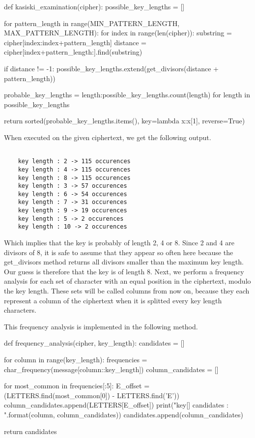 \documentclass{article}
\begin{document}
\begin{python}
def kasiski_examination(cipher):
    possible_key_lengths = []

    for pattern_length in range(MIN_PATTERN_LENGTH, MAX_PATTERN_LENGTH):
        for index in range(len(cipher)):
            substring = cipher[index:index+pattern_length]
            distance = cipher[index+pattern_length:].find(substring)

            if distance != -1:
                possible_key_lengths.extend(get_divisors(distance + pattern_length))

    probable_key_lengths = {length:possible_key_lengths.count(length) for length in possible_key_lengths}

    return sorted(probable_key_lengths.items(), key=lambda x:x[1], reverse=True)
\end{python}

\bigskip
When executed on the given ciphertext, we get the following output.

\begin{verbatim}

    key length : 2 -> 115 occurences
    key length : 4 -> 115 occurences
    key length : 8 -> 115 occurences
    key length : 3 -> 57 occurences
    key length : 6 -> 54 occurences
    key length : 7 -> 31 occurences
    key length : 9 -> 19 occurences
    key length : 5 -> 2 occurences
    key length : 10 -> 2 occurences

\end{verbatim}

Which implies that the key is probably of length 2, 4 or 8. Since 2 and 4 are divisors of 8, it is safe to assume that they appear so often here because the get\_divisors method returns all divisors smaller than the maximum key length. Our guess is therefore that the key is of length 8.
Next, we perform a frequency analysis for each set of character with an equal position in the ciphertext, modulo the key length. These sets will be called columns from now on, because they each represent a column of the ciphertext when it is splitted every key length characters.

This frequency analysis is implemented in the following method.

\bigskip
\begin{python}
def frequency_analysis(cipher, key_length):
    candidates = []

    for column in range(key_length):
        frequencies = char_frequency(message[column::key_length])
        column_candidates = []

        for most_common in frequencies[:5]:
            E_offset = (LETTERS.find(most_common[0]) - LETTERS.find('E')) %
            column_candidates.append(LETTERS[E_offset])
        print("key[{}] candidates : {}".format(column, column_candidates))
        candidates.append(column_candidates)

    return candidates
\end{python}
\bigskip
\end{document}
